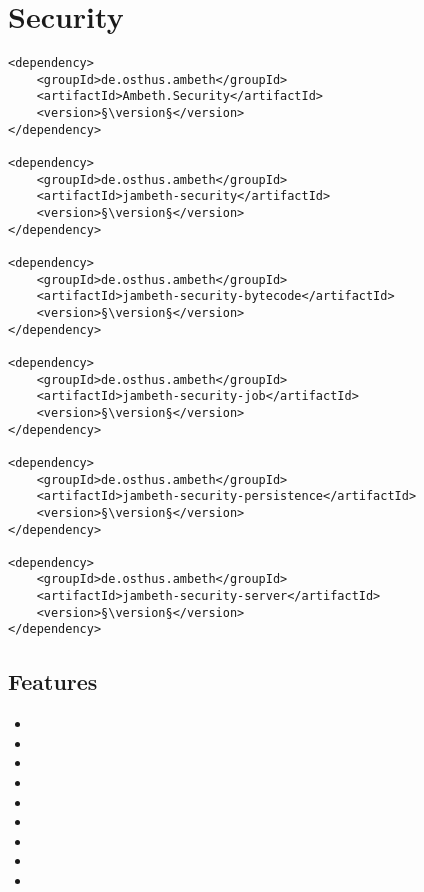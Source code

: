 \section{Security}
\label{module:Security}
\ClearAPI
\TODO
\begin{lstlisting}[style=POM,caption={Maven modules to use \emph{Ambeth Security}}]
<dependency>
	<groupId>de.osthus.ambeth</groupId>
	<artifactId>Ambeth.Security</artifactId>
	<version>§\version§</version>
</dependency>

<dependency>
	<groupId>de.osthus.ambeth</groupId>
	<artifactId>jambeth-security</artifactId>
	<version>§\version§</version>
</dependency>

<dependency>
	<groupId>de.osthus.ambeth</groupId>
	<artifactId>jambeth-security-bytecode</artifactId>
	<version>§\version§</version>
</dependency>

<dependency>
	<groupId>de.osthus.ambeth</groupId>
	<artifactId>jambeth-security-job</artifactId>
	<version>§\version§</version>
</dependency>

<dependency>
	<groupId>de.osthus.ambeth</groupId>
	<artifactId>jambeth-security-persistence</artifactId>
	<version>§\version§</version>
</dependency>

<dependency>
	<groupId>de.osthus.ambeth</groupId>
	<artifactId>jambeth-security-server</artifactId>
	<version>§\version§</version>
</dependency>
\end{lstlisting}
\subsection{Features}
\begin{itemize}
	\item {}
	\item {}
	\item {}
	\item {}
	\item {}
	\item {}
	\item {}
	\item {}
	\item {}
\end{itemize}


